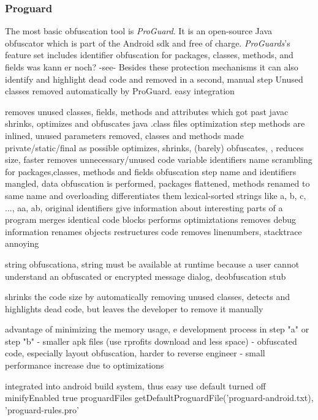 \subsubsection{Proguard} \label{subsection:counter-obfuscation-solution-proguard}
The most basic obfuscation tool is \textit{ProGuard}.
It is an open-source Java obfuscator which is part of the Android \gls{sdk} and free of charge.
\newline
\textit{ProGuards}'s
feature set includes identifier obfuscation for packages, classes, methods, and fields
was kann er noch? -see- Besides these protection mechanisms it can also
identify and highlight dead code and removed in a second, manual step
Unused classes removed automatically by ProGuard.
easy integration




removes unused classes, fields, methods and attributes which got past javac
shrinks, optimizes and obfuscates java .class files
optimization step methods are inlined, unused parameters removed, classes and methods made private/static/final as possible
optimizes, shrinks, (barely) obfuscates, , reduces size, faster
removes unnecessary/unused code
variable identifiers name scrambling for packages,classes, methods and fields
obfuscation step name and identifiers mangled, data obfuscation is performed, packages flattened, methods renamed to same name and overloading differentiates them
lexical-sorted strings like {a, b, c, ..., aa, ab}, original identifiers give information about interesting parts of a program
merges identical code blocks
performs optimiztations
removes debug information
renames objects
restructures code
removes linenumbers, stacktrace annoying

string obfuscationa, string must be available at runtime because a user cannot
understand an obfuscated or encrypted message dialog, deobfuscation stub

shrinks the code size by automatically removing unused classes, detects and highlights dead code, but leaves the developer to remove it manually

advantage of minimizing the memory usage, e development process in step "a" or step "b" \newline
- smaller apk files (use rprofits download and less space)
- obfuscated code, especially layout obfuscation, harder to reverse engineer
- small performance increase due to optimizations

integrated into android build system, thus easy use
default turned off
minifyEnabled true
proguardFiles getDefaultProguardFile('proguard-android.txt), 'proguard-rules.pro'
\cite{schulzLabCourse}
\cite{proguardLicensing}
\cite{strazzareLevel0}
\cite{proguard}
\cite{androidProguard}
